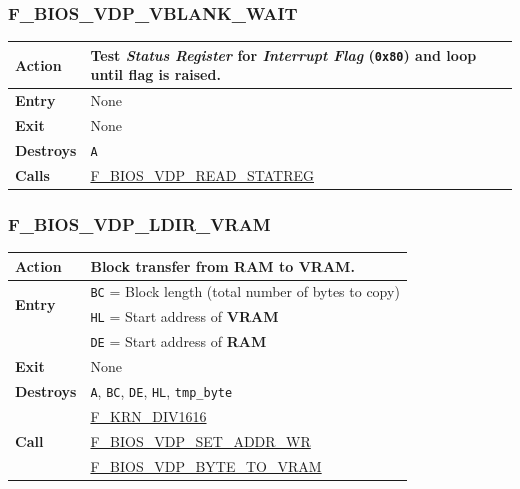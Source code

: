 \documentclass[a4paper,11pt]{article}
\begin{document}
        \subsubsection{F\_BIOS\_VDP\_VBLANK\_WAIT}
        \label{func:fbiosvdpvblankwait}
        \begin{tabular}{l p{9cm}}
            \hline\textbf{Action}
            & Test \textit{Status Register} for \textit{Interrupt Flag}
            (\texttt{0x80}) and loop until flag is raised.\\
            \hline\textbf{Entry} & None\\
            \hline\textbf{Exit} & None\\
            \hline\textbf{Destroys} & \texttt{A}\\
            \hline\textbf{Calls} & 
            \hyperref[func:fbiosvdpreadstatreg]{F\_BIOS\_VDP\_READ\_STATREG}\\
            \hline
        \end{tabular}

        \subsubsection{F\_BIOS\_VDP\_LDIR\_VRAM}
        \label{func:fbiosvdpldirvram}
        \begin{tabular}{l p{9cm}}
            \hline\textbf{Action}
            & Block transfer from \textbf{RAM} to \textbf{VRAM}.\\
            \hline\multirow[t]{2}{4em}{\textbf{Entry}} & \texttt{BC} = Block 
            length (total number of bytes to copy)\\
            & \texttt{HL} = Start address of \textbf{VRAM}\\
            & \texttt{DE} = Start address of \textbf{RAM}\\
            \hline\textbf{Exit} & None\\
            \hline\textbf{Destroys} & \texttt{A}, \texttt{BC}, \texttt{DE},
            \texttt{HL}, \texttt{tmp\_byte}\\
            \hline\multirow[t]{3}{4em}{\textbf{Call}}
            & \hyperref[func:fkrndiv1616]{F\_KRN\_DIV1616}\\
            & \hyperref[func:fbiosvdpsetaddrwr]{F\_BIOS\_VDP\_SET\_ADDR\_WR}\\
            & \hyperref[func:fbiosvdpbytetovram]{F\_BIOS\_VDP\_BYTE\_TO\_VRAM}\\
            \hline
        \end{tabular}
\end{document}

